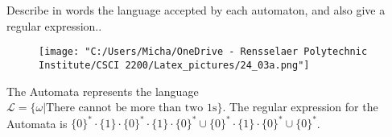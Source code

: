 \documentclass{article}
\begin{document}
\clearpage

\begin{addmargin}[2em]{2em}
	  Describe in words the language accepted by each automaton, and also give a regular expression..\\
	\begin{figure}[h]
		\begin{center}
			\texttt{[image: "C:/Users/Micha/OneDrive - Rensselaer Polytechnic Institute/CSCI 2200/Latex\_pictures/24\_03a.png"]}\\
		\end{center}
	\end{figure}
	
	The Automata represents the language $\mathcal{L}=\{\omega|\text{There cannot be more than two 1s}\}$. The regular expression for the Automata is $\{0\}^* \cdot \{1\} \cdot \{0\}^* \cdot \{1\} \cdot \{0\}^* \cup \{0\}^* \cdot \{1\} \cdot \{0\}^* \cup \{0\}^*$.
\end{addmargin}
\clearpage
\end{document}
